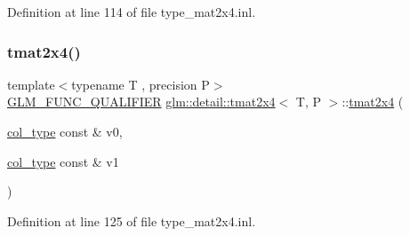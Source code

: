 Definition at line 114 of file type\+\_\+mat2x4.\+inl.

\mbox{\label{structglm_1_1detail_1_1tmat2x4_ab0203c409f15c920754cb7ee35bb387c}} 
\subsubsection{\texorpdfstring{tmat2x4()}{tmat2x4()}\hspace{0.1cm}{\footnotesize\ttfamily [7/22]}}
{\footnotesize\ttfamily template$<$typename T , precision P$>$ \\
\hyperlink{setup_8hpp_a33fdea6f91c5f834105f7415e2a64407}{G\+L\+M\+\_\+\+F\+U\+N\+C\+\_\+\+Q\+U\+A\+L\+I\+F\+I\+ER} \hyperlink{structglm_1_1detail_1_1tmat2x4}{glm\+::detail\+::tmat2x4}$<$ T, P $>$\+::\hyperlink{structglm_1_1detail_1_1tmat2x4}{tmat2x4} (\begin{DoxyParamCaption}\item[{\hyperlink{structglm_1_1detail_1_1tmat2x4_a7324a2efc8a0f59f538568015bdda76b}{col\+\_\+type} const \&}]{v0,  }\item[{\hyperlink{structglm_1_1detail_1_1tmat2x4_a7324a2efc8a0f59f538568015bdda76b}{col\+\_\+type} const \&}]{v1 }\end{DoxyParamCaption})}



Definition at line 125 of file type\+\_\+mat2x4.\+inl.

\mbox{\label{structglm_1_1detail_1_1tmat2x4_a062180e9aa13dc809833a430d28ac3df}} 
